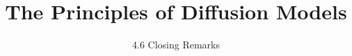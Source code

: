 
\title{The Principles of Diffusion Models}
\subtitle{4.6 Closing Remarks}


\begin{frame}
    \titlepage
\end{frame}


